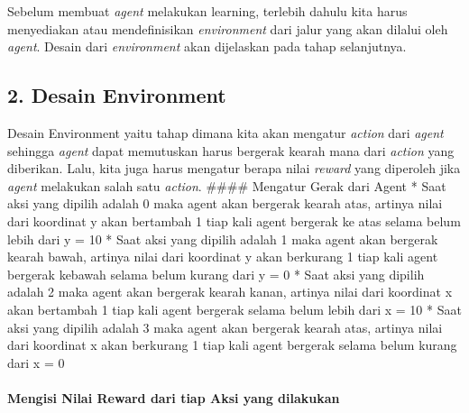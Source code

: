 \documentclass[11pt]{article}
\begin{document}
Sebelum membuat \emph{agent} melakukan learning, terlebih dahulu kita
harus menyediakan atau mendefinisikan \emph{environment} dari jalur yang
akan dilalui oleh \emph{agent}. Desain dari \emph{environment} akan
dijelaskan pada tahap selanjutnya.

    \subsection{2. Desain Environment}\label{desain-environment}

Desain Environment yaitu tahap dimana kita akan mengatur \emph{action}
dari \emph{agent} sehingga \emph{agent} dapat memutuskan harus bergerak
kearah mana dari \emph{action} yang diberikan. Lalu, kita juga harus
mengatur berapa nilai \emph{reward} yang diperoleh jika \emph{agent}
melakukan salah satu \emph{action}. \#\#\#\# Mengatur Gerak dari Agent *
Saat aksi yang dipilih adalah 0 maka agent akan bergerak kearah atas,
artinya nilai dari koordinat y akan bertambah 1 tiap kali agent bergerak
ke atas selama belum lebih dari y = 10 * Saat aksi yang dipilih adalah 1
maka agent akan bergerak kearah bawah, artinya nilai dari koordinat y
akan berkurang 1 tiap kali agent bergerak kebawah selama belum kurang
dari y = 0 * Saat aksi yang dipilih adalah 2 maka agent akan bergerak
kearah kanan, artinya nilai dari koordinat x akan bertambah 1 tiap kali
agent bergerak selama belum lebih dari x = 10 * Saat aksi yang dipilih
adalah 3 maka agent akan bergerak kearah atas, artinya nilai dari
koordinat x akan berkurang 1 tiap kali agent bergerak selama belum
kurang dari x = 0

\paragraph{Mengisi Nilai Reward dari tiap Aksi yang
dilakukan}\label{mengisi-nilai-reward-dari-tiap-aksi-yang-dilakukan}
\end{document}
